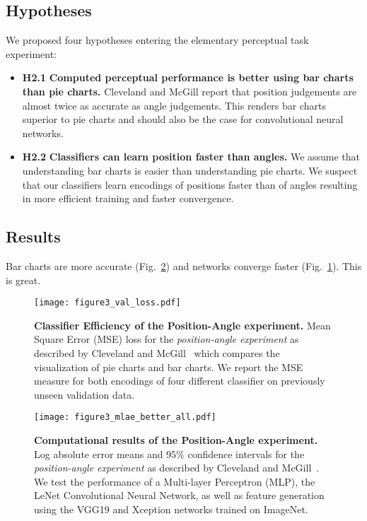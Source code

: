 \subsection{Hypotheses}

We proposed four hypotheses entering the elementary perceptual task experiment:

\begin{itemize}
	\item \textbf{H2.1} \textbf{Computed perceptual performance is better using bar charts than pie charts.} Cleveland and McGill report that position judgements are almost twice as accurate as angle judgements. This renders bar charts superior to pie charts and should also be the case for convolutional neural networks.
	\item \textbf{H2.2} \textbf{Classifiers can learn position faster than angles.} We assume that understanding bar charts is easier than understanding pie charts. We suspect that our classifiers learn encodings of positions faster than of angles resulting in more efficient training and faster convergence.
\end{itemize}

\subsection{Results}


Bar charts are more accurate (Fig.~\ref{fig:figure3_mlae}) and networks converge faster (Fig.~\ref{fig:figure3_val_loss}). This is great.

\begin{figure}[t]
	  \texttt{[image: figure3\_val\_loss.pdf]}
  \caption{\textbf{Classifier Efficiency of the Position-Angle experiment.} Mean Square Error (MSE) loss for the \emph{position-angle experiment} as described by Cleveland and McGill~\cite{cleveland_mcgill} which compares the visualization of pie charts and bar charts. We report the MSE measure for both encodings of four different classifier on previously unseen validation data.}
	\label{fig:figure3_val_loss}
\end{figure}

\begin{figure}[t]
	\centering
	  \texttt{[image: figure3\_mlae\_better\_all.pdf]}
  \caption{\textbf{Computational results of the Position-Angle experiment.} Log absolute error means and 95\% confidence intervals for the \emph{position-angle experiment} as described by Cleveland and McGill~\cite{cleveland_mcgill}. We test the performance of a Multi-layer Perceptron (MLP), the LeNet Convolutional Neural Network, as well as feature generation using the VGG19 and Xception networks trained on ImageNet.}
	\label{fig:figure3_mlae}
\end{figure}
